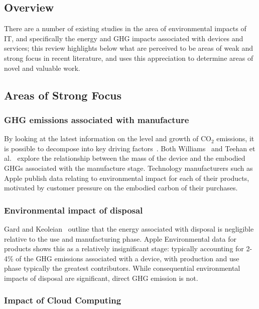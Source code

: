 \documentclass[conference]{IEEEtran}
\begin{document}
\subsection{Overview}

There are a number of existing studies in the area of environmental
impacts of IT, and specifically the energy and GHG impacts associated
with devices and services; this review highlights below what are
perceived to be areas of weak and strong focus in recent literature,
and uses this appreciation to determine areas of novel and valuable
work.

\subsection{Areas of Strong Focus}

\subsubsection{GHG emissions associated with manufacture}

By looking at the latest information on the level and growth of CO$_2$
emissions, it is possible to decompose into key driving
factors~\cite{ieaco2em:2014}. Both Williams~\cite{williams:2004} and
Teehan et al.~\cite{teehan-et-al:2010} explore the relationship
between the mass of the device and the embodied GHGs associated with
the manufacture stage. Technology manufacturers such as Apple publish data
relating to environmental impact for each of their products, motivated
by customer pressure on the embodied carbon of their purchases.

\subsubsection{Environmental impact of disposal}

Gard and Keoleian~\cite{gard+keoleian:2002} outline that the energy
associated with disposal is negligible relative to the use and
manufacturing phase. Apple Environmental data for products shows this
as a relatively insignificant stage: typically accounting for 2-4\% of
the GHG emissions associated with a device, with production and use
phase typically the greatest contributors. While consequential
environmental impacts of disposal are significant, direct GHG emission
is not.

\subsubsection{Impact of Cloud Computing}
\end{document}
